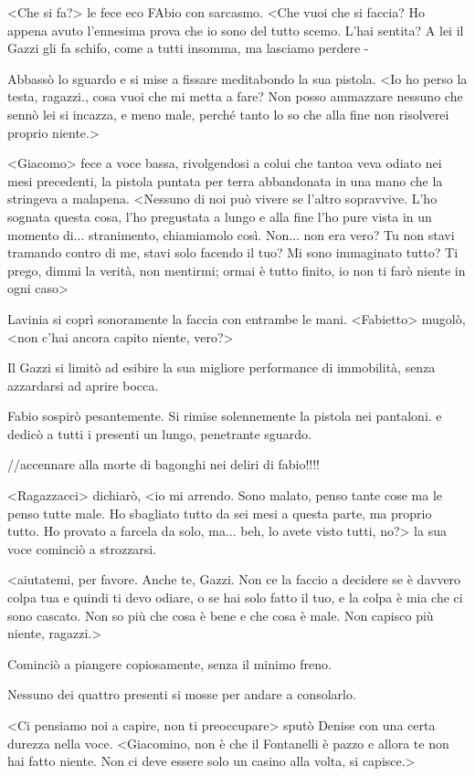 <Che si fa?> le fece eco FAbio con sarcasmo. <Che vuoi che si faccia? Ho appena avuto l'ennesima prova che io sono del tutto scemo. L'hai sentita? A lei il Gazzi gli fa schifo, come a tutti insomma, ma lasciamo perdere -

Abbassò lo sguardo e si mise a fissare meditabondo la sua pistola. <Io ho perso la testa, ragazzi., cosa vuoi che mi metta a fare? Non posso ammazzare nessuno che sennò lei si incazza, e meno male, perché tanto lo so che alla fine non risolverei proprio niente.>

<Giacomo> fece a voce bassa, rivolgendosi a colui che tantoa veva odiato nei mesi precedenti, la pistola puntata per terra abbandonata in una mano che la stringeva a malapena. <Nessuno di noi può vivere se l'altro sopravvive. L'ho sognata questa cosa, l'ho pregustata a lungo e alla fine l'ho pure vista in un momento di... stranimento, chiamiamolo così. Non... non era vero? Tu non stavi tramando contro di me, stavi solo facendo il tuo? Mi sono immaginato tutto? Ti prego, dimmi la verità, non mentirmi; ormai è tutto finito, io non ti farò niente in ogni caso>

Lavinia si coprì sonoramente la faccia con entrambe le mani. <Fabietto> mugolò, <non c'hai ancora capito niente, vero?>

Il Gazzi si limitò ad esibire la sua migliore performance di immobilità, senza azzardarsi ad aprire bocca.

Fabio sospirò pesantemente. Si rimise solennemente la pistola nei pantaloni. e dedicò a tutti i presenti un lungo, penetrante sguardo.

//accennare alla morte di bagonghi nei deliri di fabio!!!!

<Ragazzacci> dichiarò, <io mi arrendo. Sono malato, penso tante cose ma le penso tutte male. Ho sbagliato tutto da sei mesi a questa parte, ma proprio tutto. Ho provato a farcela da solo, ma... beh, lo avete visto tutti, no?> la sua voce cominciò a strozzarsi.

<aiutatemi, per favore. Anche te, Gazzi. Non ce la faccio a decidere se è davvero colpa tua e quindi ti devo odiare, o se hai solo fatto il tuo, e la colpa è mia che ci sono cascato. Non so più che cosa è bene e che cosa è male. Non capisco più niente, ragazzi.>

Cominciò a piangere copiosamente, senza il minimo freno. 

Nessuno dei quattro presenti si mosse per andare a consolarlo.

<Ci pensiamo noi a capire, non ti preoccupare> sputò Denise con una certa durezza nella voce. <Giacomino, non è che il Fontanelli è pazzo e allora te non hai fatto niente. Non ci deve essere solo un casino alla volta, si capisce.>

